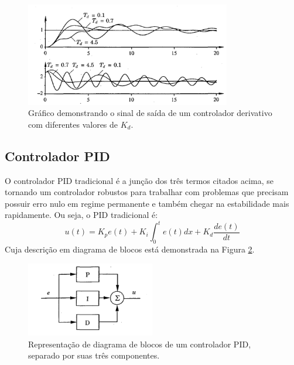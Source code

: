 \begin{figure}[ht]
    \centering
    \includegraphics[width=0.8\textwidth]{capitulos/acao_controle_derivativo.png}
    \caption{Gráfico demonstrando o sinal de saída de um controlador derivativo com diferentes valores de $K_{d}$. \cite{astrom1995}}
    \label{fig:acao_controle_derivativo}
\end{figure}
\subsection{Controlador PID}
O controlador PID tradicional é a junção dos três termos citados acima, se tornando um controlador robustos para trabalhar com problemas que precisam possuir erro nulo em regime permanente e também chegar na estabilidade mais rapidamente.\cite{ogata2011engenharia} Ou seja, o PID tradicional é:
\begin{equation}
    u(t) = K_{p} e(t) + K_{i} \int_0^t e(t) dx + K_{d} \frac{de(t)}{dt}
\end{equation}
Cuja descrição em diagrama de blocos está demonstrada na Figura \ref{fig:representacao_pid}.
\begin{figure}[ht]
    \centering
    \includegraphics[width=0.5\textwidth]{capitulos/representacao_pid.png}
    \caption{Representação de diagrama de blocos de um controlador PID, separado por suas três componentes. \cite{astrom1995}}
    \label{fig:representacao_pid}
\end{figure}
